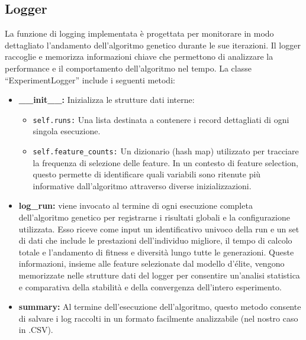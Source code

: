 \documentclass[11pt,a4paper]{article}
\begin{document}
\subsection{Logger}
La funzione di logging implementata è progettata per monitorare in modo dettagliato l'andamento dell'algoritmo genetico durante le sue iterazioni. Il logger raccoglie e memorizza informazioni chiave che permettono di analizzare la performance e il comportamento dell'algoritmo nel tempo. La classe ``ExperimentLogger'' include i seguenti metodi:
\begin{itemize}
  \item \textbf{\_\_init\_\_:} Inizializza le strutture dati interne:
         \begin{itemize}
            \item \texttt{self.runs:} Una lista destinata a contenere i record dettagliati di ogni singola esecuzione.
            \item \texttt{self.feature\_counts:} Un dizionario (hash map) utilizzato per tracciare la frequenza di selezione delle feature. In un contesto di feature selection, questo permette di identificare quali variabili sono ritenute più informative dall'algoritmo attraverso diverse inizializzazioni.
        \end{itemize}
  \item \textbf{log\_run:} viene invocato al termine di ogni esecuzione completa dell'algoritmo genetico per registrarne i risultati globali e la configurazione utilizzata. Esso riceve come input un identificativo univoco della run e un set di dati che include le prestazioni dell'individuo migliore, il tempo di calcolo totale e l'andamento di fitness e diversità lungo tutte le generazioni. Queste informazioni, insieme alle feature selezionate dal modello d'élite, vengono memorizzate nelle strutture dati del logger per consentire un'analisi statistica e comparativa della stabilità e della convergenza dell'intero esperimento. 
  \item \textbf{summary:} Al termine dell'esecuzione dell'algoritmo, questo metodo consente di salvare i log raccolti in un formato facilmente analizzabile (nel nostro caso in .CSV).
\end{itemize}
\end{document}
